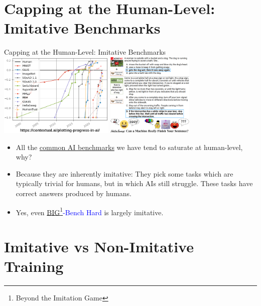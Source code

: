 \documentclass{beamer}
\begin{document}
\section{Capping at the Human-Level: Imitative Benchmarks}

\begin{frame}{Capping at the Human-Level: Imitative Benchmarks}
  \href{https://contextual.ai/plotting-progress-in-ai/}{\includegraphics[height=4cm]{AI-progress.png}}
  \hspace{0.3cm}
  \href{https://arxiv.org/abs/1905.07830}{\includegraphics[height=4cm]{HellaSwag.png}}
  \begin{itemize}
    \item All the \textcolor{blue}{\href{https://www.whytryai.com/p/llm-benchmarks}{common AI benchmarks}} we have tend to saturate at human-level, why?
    \item Because they are inherently imitative: They pick some tasks which are typically trivial for humans, but in which AIs still struggle. These tasks have correct answers produced by humans.
    \item Yes, even \textcolor{blue}{\href{https://github.com/google/BIG-bench/blob/main/bigbench/benchmark_tasks/README.md}{BIG\footnote{Beyond the Imitation Game}-Bench Hard}} is largely imitative.
  \end{itemize}
\end{frame}

\section{Imitative vs Non-Imitative Training}
\end{document}
